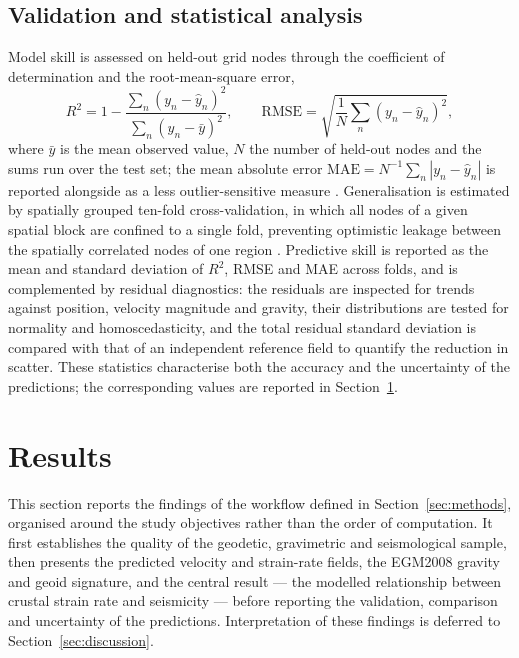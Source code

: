 \documentclass[pdflatex,sn-mathphys-num]{sn-jnl}%
\theoremstyle{thmstyleone}%
\theoremstyle{thmstyletwo}%
\theoremstyle{thmstylethree}%
\begin{document}
\subsection{Validation and statistical analysis}\label{sec:valid}
Model skill is assessed on held-out grid nodes through the coefficient of determination
and the root-mean-square error,
\begin{equation}
R^{2}=1-\frac{\sum_{n}(y_n-\hat{y}_n)^{2}}{\sum_{n}(y_n-\bar{y})^{2}},
\qquad
\mathrm{RMSE}=\sqrt{\frac{1}{N}\sum_{n}(y_n-\hat{y}_n)^{2}},
\label{eq:metrics}
\end{equation}
where $\bar{y}$ is the mean observed value, $N$ the number of held-out nodes and the
sums run over the test set; the mean absolute error $\mathrm{MAE}=N^{-1}\sum_n|y_n-\hat{y}_n|$
is reported alongside as a less outlier-sensitive measure
\cite{Pedregosa2011,Friedman2001,Lemenkova202411,Breiman2001,Virtanen2020}. Generalisation is estimated by spatially grouped
ten-fold cross-validation, in which all nodes of a given spatial block are confined to a
single fold, preventing optimistic leakage between the spatially correlated nodes of one
region \cite{Pedregosa2011,Reichstein2019,Lemenkova202316,Bergen2019,MousaviBeroza2023}. Predictive skill is reported
as the mean and standard deviation of $R^{2}$, RMSE and MAE across folds, and is
complemented by residual diagnostics: the residuals are inspected for trends against
position, velocity magnitude and gravity, their distributions are tested for normality
and homoscedasticity, and the total residual standard deviation is compared with that of
an independent reference field to quantify the reduction in scatter. These statistics
characterise both the accuracy and the uncertainty of the predictions; the corresponding
values are reported in Section~\ref{sec:results}.

\section{Results}\label{sec:results}
This section reports the findings of the workflow defined in Section~\ref{sec:methods},
organised around the study objectives rather than the order of computation. It first
establishes the quality of the geodetic, gravimetric and seismological sample, then
presents the predicted velocity and strain-rate fields, the EGM2008 gravity and geoid
signature, and the central result --- the modelled relationship between crustal strain
rate and seismicity --- before reporting the validation, comparison and uncertainty of
the predictions. Interpretation of these findings is deferred to
Section~\ref{sec:discussion}.
\end{document}
